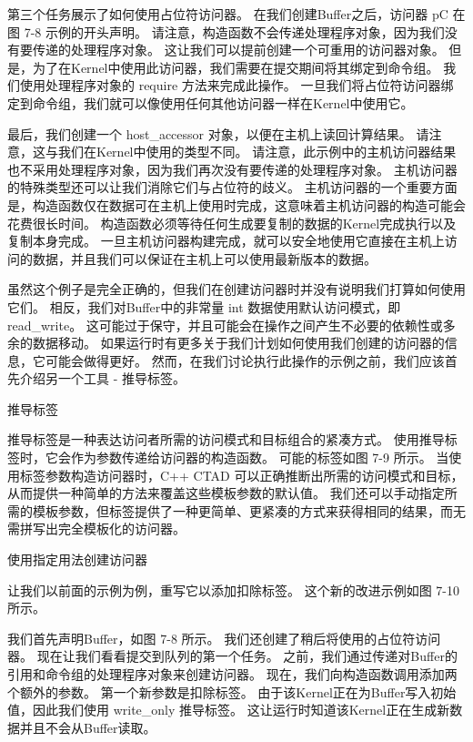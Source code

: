 第三个任务展示了如何使用占位符访问器。 在我们创建Buffer之后，访问器 pC 在图 7-8 示例的开头声明。 
请注意，构造函数不会传递处理程序对象，因为我们没有要传递的处理程序对象。 
这让我们可以提前创建一个可重用的访问器对象。 但是，为了在Kernel中使用此访问器，我们需要在提交期间将其绑定到命令组。 
我们使用处理程序对象的 require 方法来完成此操作。 
一旦我们将占位符访问器绑定到命令组，我们就可以像使用任何其他访问器一样在Kernel中使用它。

最后，我们创建一个 host\_accessor 对象，以便在主机上读回计算结果。 
请注意，这与我们在Kernel中使用的类型不同。 
请注意，此示例中的主机访问器结果也不采用处理程序对象，因为我们再次没有要传递的处理程序对象。 
主机访问器的特殊类型还可以让我们消除它们与占位符的歧义。 
主机访问器的一个重要方面是，构造函数仅在数据可在主机上使用时完成，这意味着主机访问器的构造可能会花费很长时间。 
构造函数必须等待任何生成要复制的数据的Kernel完成执行以及复制本身完成。 
一旦主机访问器构建完成，就可以安全地使用它直接在主机上访问的数据，并且我们可以保证在主机上可以使用最新版本的数据。

虽然这个例子是完全正确的，但我们在创建访问器时并没有说明我们打算如何使用它们。 
相反，我们对Buffer中的非常量 int 数据使用默认访问模式，即 read\_write。 
这可能过于保守，并且可能会在操作之间产生不必要的依赖性或多余的数据移动。 
如果运行时有更多关于我们计划如何使用我们创建的访问器的信息，它可能会做得更好。 
然而，在我们讨论执行此操作的示例之前，我们应该首先介绍另一个工具 - 推导标签。

{\color{red} 推导标签}

推导标签是一种表达访问者所需的访问模式和目标组合的紧凑方式。 
使用推导标签时，它会作为参数传递给访问器的构造函数。 
可能的标签如图 7-9 所示。 当使用标签参数构造访问器时，C++ CTAD 可以正确推断出所需的访问模式和目标，
从而提供一种简单的方法来覆盖这些模板参数的默认值。 
我们还可以手动指定所需的模板参数，但标签提供了一种更简单、更紧凑的方式来获得相同的结果，而无需拼写出完全模板化的访问器。

{\color{red} 使用指定用法创建访问器}

让我们以前面的示例为例，重写它以添加扣除标签。 这个新的改进示例如图 7-10 所示。

我们首先声明Buffer，如图 7-8 所示。 我们还创建了稍后将使用的占位符访问器。 
现在让我们看看提交到队列的第一个任务。 之前，我们通过传递对Buffer的引用和命令组的处理程序对象来创建访问器。 
现在，我们向构造函数调用添加两个额外的参数。 第一个新参数是扣除标签。 
由于该Kernel正在为Buffer写入初始值，因此我们使用 write\_only 推导标签。 
这让运行时知道该Kernel正在生成新数据并且不会从Buffer读取。

